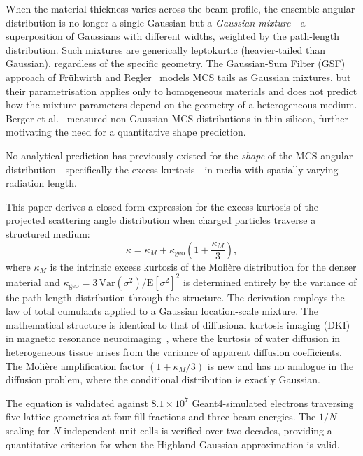 \documentclass[final,5p,times,twocolumn]{elsarticle}
\begin{document}
When the material thickness varies across the beam profile, the ensemble angular distribution is no longer a single Gaussian but a \emph{Gaussian mixture}---a superposition of Gaussians with different widths, weighted by the path-length distribution.  Such mixtures are generically leptokurtic (heavier-tailed than Gaussian), regardless of the specific geometry.  The Gaussian-Sum Filter (GSF) approach of Fr\"uhwirth and Regler~\cite{FruhwirthRegler2001} models MCS tails as Gaussian mixtures, but their parametrisation applies only to homogeneous materials and does not predict how the mixture parameters depend on the geometry of a heterogeneous medium.  Berger et al.~\cite{Berger2014} measured non-Gaussian MCS distributions in thin silicon, further motivating the need for a quantitative shape prediction.

No analytical prediction has previously existed for the \emph{shape} of the MCS angular distribution---specifically the excess kurtosis---in media with spatially varying radiation length.

This paper derives a closed-form expression for the excess kurtosis of the projected scattering angle distribution when charged particles traverse a structured medium:
\begin{equation}
  \kappa = \kappa_M + \kappa_{\mathrm{geo}}\!\left(1 + \frac{\kappa_M}{3}\right),
  \label{eq:universal}
\end{equation}
where $\kappa_M$ is the intrinsic excess kurtosis of the Moli\`{e}re distribution for the denser material and $\kappa_{\mathrm{geo}} = 3\,\mathrm{Var}(\sigma^2)/\mathrm{E}[\sigma^2]^2$ is determined entirely by the variance of the path-length distribution through the structure.  The derivation employs the law of total cumulants applied to a Gaussian location-scale mixture.  The mathematical structure is identical to that of diffusional kurtosis imaging (DKI) in magnetic resonance neuroimaging~\cite{Jensen2005}, where the kurtosis of water diffusion in heterogeneous tissue arises from the variance of apparent diffusion coefficients.  The Moli\`{e}re amplification factor $(1+\kappa_M/3)$ is new and has no analogue in the diffusion problem, where the conditional distribution is exactly Gaussian.

The equation is validated against $8.1\times10^7$ Geant4-simulated electrons traversing five lattice geometries at four fill fractions and three beam energies.  The $1/N$ scaling for $N$ independent unit cells is verified over two decades, providing a quantitative criterion for when the Highland Gaussian approximation is valid.
\end{document}
